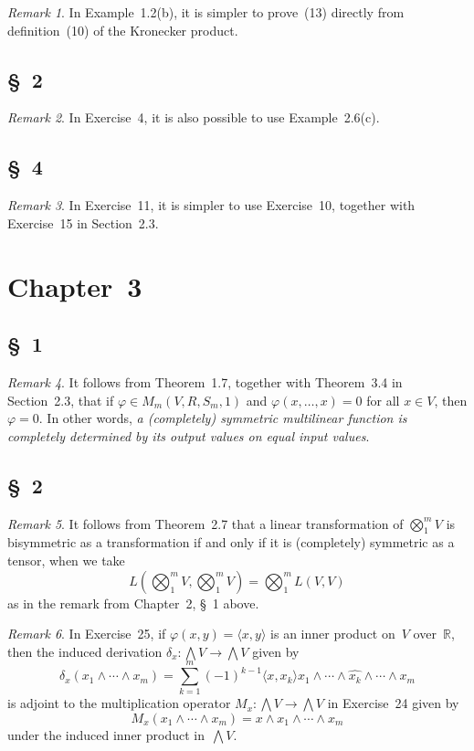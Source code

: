 \documentclass[letterpaper,12pt]{article}
\newcommand{\R}{\mathbb{R}}
\newcommand{\bigtprod}{\bigotimes}
\newcommand{\medtprod}{{\textstyle\bigtprod}}
\newcommand{\eprod}{\wedge}
\newcommand{\bigeprod}{\bigwedge}
\newcommand{\medeprod}{{\textstyle\bigeprod}}
\newcommand{\delete}{\widehat}
\newcommand{\sprod}[2]{\langle#1,#2\rangle}
\newcommand{\multi}[4]{#2_{#3}#1\cdots#1#2_{#4}}
\newcommand{\eprods}[3]{\multi{\eprod}{#1}{#2}{#3}}
\theoremstyle{definition}
\theoremstyle{remark}
\newtheorem*{rmk}{Remark}
\begin{document}
\begin{rmk}
In Example~1.2(b), it is simpler to prove~(13) directly from definition~(10) of the Kronecker product.
\end{rmk}

\subsection*{\S~2}
\begin{rmk}
In Exercise~4, it is also possible to use Example~2.6(c).
\end{rmk}

\subsection*{\S~4}
\begin{rmk}
In Exercise~11, it is simpler to use Exercise~10, together with Exercise~15 in Section~2.3.
\end{rmk}

\newpage
\section*{Chapter~3}
\subsection*{\S~1}
\begin{rmk}
It follows from Theorem~1.7, together with Theorem~3.4 in Section~2.3, that if \(\varphi\in M_m(V,R,S_m,1)\) and \(\varphi(x,\ldots,x)=0\) for all \(x\in V\), then \(\varphi=0\). In other words, \emph{a (completely) symmetric multilinear function is completely determined by its output values on equal input values}.
\end{rmk}

\subsection*{\S~2}
\begin{rmk}
It follows from Theorem~2.7 that a linear transformation of \(\medtprod_1^m V\) is bisymmetric as a transformation if and only if it is (completely) symmetric as a tensor, when we take
\[L(\medtprod_1^m V,\medtprod_1^m V)=\medtprod_1^m L(V,V)\]
as in the remark from Chapter~2, \S~1 above.
\end{rmk}

\begin{rmk}
In Exercise~25, if \(\varphi(x,y)=\sprod{x}{y}\) is an inner product on~\(V\) over~\(\R\), then the induced derivation \(\delta_x:\medeprod V\to\medeprod V\) given by
\[\delta_x(\eprods{x}{1}{m})=\sum_{k=1}^m(-1)^{k-1}\sprod{x}{x_k}x_1\eprod\cdots\eprod\delete{x_k}\eprod\cdots\eprod x_m\]
is adjoint to the multiplication operator \(M_x:\medeprod V\to\medeprod V\) in Exercise~24 given by
\[M_x(\eprods{x}{1}{m})=x\eprod\eprods{x}{1}{m}\]
under the induced inner product in~\(\medeprod V\).
\end{rmk}
\end{document}
